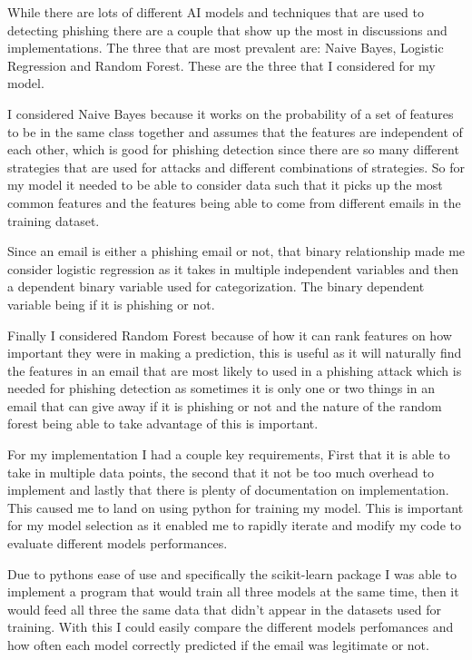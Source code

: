 \documentclass[a4paper,10pt]{article}
\newcounter{req}[subsection]
\begin{document}
While there are lots of different AI models and techniques that are used to
detecting phishing there are a couple that show up the most in discussions and
implementations. The three that are most prevalent are: Naive Bayes, Logistic
Regression and Random Forest. These are the three that I considered for my
model. \par

I considered Naive Bayes because it works on the probability of a set of
features to be in the same class together and assumes that the features are
independent of each other, which is good for phishing detection since there are
so many different strategies that are used for attacks and different
combinations of strategies. So for my model it needed to be able to consider
data such that it picks up the most common features and the features being able
to come from different emails in the training dataset. \par

Since an email is either a phishing email or not, that binary relationship made
me consider logistic regression as it takes in multiple independent variables
and then a dependent binary variable used for categorization. The binary
dependent variable being if it is phishing or not. \par

Finally I considered Random Forest because of how it can rank features on how
important they were in making a prediction, this is useful as it will naturally
find the features in an email that are most likely to used in a phishing attack
which is needed for phishing detection as sometimes it is only one or two things
in an email that can give away if it is phishing or not and the nature of the
random forest being able to take advantage of this is important. \par

For my implementation I had a couple key requirements, First that it is able to
take in multiple data points, the second that it not be too much overhead to
implement and lastly that there is plenty of documentation on implementation.
This caused me to land on using python for training my model. This is important
for my model selection as it enabled me to rapidly iterate and modify my code to
evaluate different models performances. \par

Due to pythons ease of use and specifically the scikit-learn package I was able
to implement a program that would train all three models at the same time, then
it would feed all three the same data that didn't appear in the datasets used
for training. With this I could easily compare the different models perfomances
and how often each model correctly predicted if the email was legitimate or
not.\par
\end{document}
